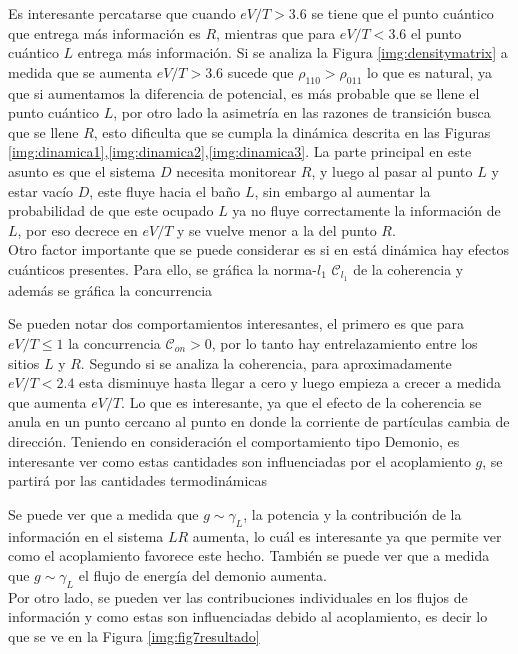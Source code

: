 Es interesante percatarse que cuando $eV/T>3.6$ se tiene que el punto cuántico que entrega más información es $R$, mientras que para $eV/T<3.6$ el punto cuántico $L$ entrega más información. Si se analiza la Figura \ref{img:densitymatrix} a medida que se aumenta $eV/T>3.6$ sucede que $\rho_{110}>\rho_{011}$ lo que es natural, ya que si aumentamos la diferencia de potencial, es más probable que se llene el punto cuántico $L$, por otro lado la asimetría en las razones de transición busca que se llene $R$, esto dificulta que se cumpla la dinámica descrita en las Figuras \ref{img:dinamica1},\ref{img:dinamica2},\ref{img:dinamica3}. La parte principal en este asunto es que el sistema $D$ necesita monitorear $R$, y luego al pasar al punto $L$ y estar vacío $D$, este fluye hacia el baño $L$, sin embargo al aumentar la probabilidad de que este ocupado $L$ ya no fluye correctamente la información de $L$, por eso decrece en $eV/T$ y se vuelve menor a la del punto $R$.
\\
Otro factor importante que se puede considerar es si en está dinámica hay efectos cuánticos presentes. Para ello, se gráfica la norma-$l_{1}$ $\mathcal{C}_{l_{1}}$ de la coherencia y además se gráfica la concurrencia 


Se pueden notar dos comportamientos interesantes, el primero es que para $eV/T \leq 1$ la concurrencia $\mathcal{C}_{on}>0$, por lo tanto hay entrelazamiento entre los sitios $L$ y $R$. Segundo si se analiza la coherencia, para aproximadamente $eV/T<2.4$ esta disminuye hasta llegar a cero y luego empieza a crecer a medida que aumenta $eV/T$. Lo que es interesante, ya que el efecto de la coherencia se anula en un punto cercano al punto en donde la corriente de partículas cambia de dirección. Teniendo en consideración el comportamiento tipo Demonio, es interesante ver como estas cantidades son influenciadas por el acoplamiento $g$, se partirá por las cantidades termodinámicas 


Se puede ver que a medida que $g\sim \gamma_{L}$, la potencia y la contribución de la información en el sistema $LR$ aumenta, lo cuál es interesante ya que permite ver como el acoplamiento favorece este hecho. También se puede ver que a medida que $g\sim \gamma_{L}$ el flujo de energía del demonio aumenta.\\
Por otro lado, se pueden ver las contribuciones individuales en los flujos de información y como estas son influenciadas debido al acoplamiento, es decir lo que se ve en la Figura \ref{img:fig7resultado}

